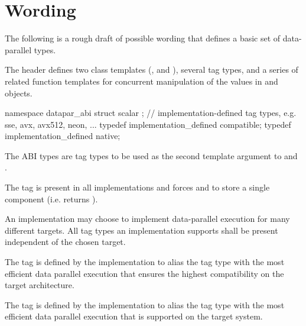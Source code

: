 \section{Wording}

The following is a rough draft of possible wording that defines a basic set of data-parallel types.

\begin{wgText}

  

  \pnum
  The header  defines two class templates (\datapar, and \mask), several tag types, and a series of related function templates for concurrent manipulation of the values in \datapar and \mask objects.

  \begin{itemdecl}
namespace datapar_abi {
  struct scalar {};
  // implementation-defined tag types, e.g. sse, avx, avx512, neon, ...
  typedef implementation_defined compatible;
  typedef implementation_defined native;
}
  \end{itemdecl}
  \begin{itemdescr}
    \pnum
    The ABI types are tag types to be used as the second template argument to \datapar and \mask.

    \pnum
    The  tag is present in all implementations and forces \datapar and \mask to store a single component (i.e. \datapar{} returns ).

    \pnum
    An implementation may choose to implement data-parallel execution for many different targets.
    All tag types an implementation supports shall be present independent of the chosen target.

    \pnum
    The  tag is defined by the implementation to alias the tag type with the most efficient data parallel execution that ensures the highest compatibility on the target architecture.

    \pnum
    The  tag is defined by the implementation to alias the tag type with the most efficient data parallel execution that is supported on the target system.
  \end{itemdescr}


\end{wgText}
